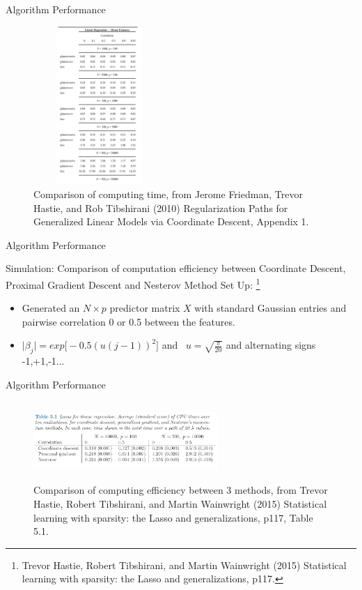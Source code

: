 \documentclass[handout]{beamer}
\begin{document}
\begin{frame}{Algorithm Performance}
\begin{figure}[h]
\centering
\includegraphics[width=5cm,height=6cm]{img/table1}
\caption{Comparison of computing time, from Jerome Friedman, Trevor Hastie, and Rob Tibshirani (2010) Regularization Paths for Generalized Linear Models via Coordinate Descent,  Appendix 1.}
\end{figure}
\end{frame}

\begin{frame}{Algorithm Performance}
\begin{block}{Simulation: Comparison of computation efficiency between Coordinate Descent, Proximal Gradient Descent and Nesterov Method}
\vspace*{3mm}
Set Up: \footnote{Trevor Hastie, Robert Tibshirani, and Martin Wainwright (2015) Statistical learning with sparsity: the Lasso and generalizations, p117.}
\begin{itemize}
    \item Generated an \(N \times p\) predictor matrix $X$ with standard Gaussian entries and pairwise correlation 0 or 0.5 between the features.
    \vspace*{3mm}
    \item \(\lvert \beta_j \rvert =exp \big[ -0.5(u(j-1))^2\big] \) and \ 
    \(u=\sqrt{\frac{\pi}{20}}\) and alternating signs -1,+1,-1...
\end{itemize}
\end{block}
\end{frame}

\begin{frame}{Algorithm Performance}
\begin{figure}[h]
\centering
\includegraphics[width=7cm,height=3cm]{img/table2}
\caption{Comparison of computing efficiency between 3 methods, from Trevor Hastie, Robert Tibshirani, and Martin Wainwright (2015) Statistical learning with sparsity: the Lasso and generalizations, p117, Table 5.1.}
\end{figure}
\end{frame}
\end{document}
